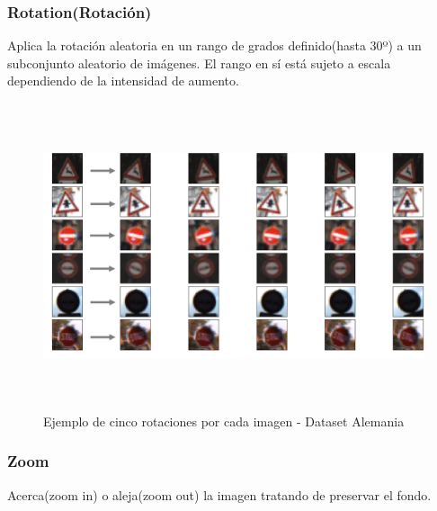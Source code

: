 		\subsubsection{Rotation(Rotación)}
			\vspace{-1.5em}
			Aplica la rotación aleatoria en un rango de grados definido(hasta 30º) a un subconjunto aleatorio de imágenes.
	        El rango en sí está sujeto a escala dependiendo de la intensidad de aumento.

	        \begin{figure}[H]
				\begin{center}
				\includegraphics[width=1\textwidth,height=9cm]{images/desarrollo/Augment/fixedrotation}
				\end{center}
				\begin{center}
				\caption{\small{Ejemplo de cinco rotaciones por cada imagen - Dataset Alemania}}
				\vspace{-1em}
			{\small{\fontsize{10}{16.8}\selectfont {Fuente propia}}}
				\end{center}
				\vspace{-1.5em}
			\end{figure}
			\vspace{-2.5em}
	    

	    \subsubsection{Zoom}
	    	\vspace{-1.5em}
	    	Acerca(zoom in) o aleja(zoom out) la imagen  tratando de preservar el fondo.


